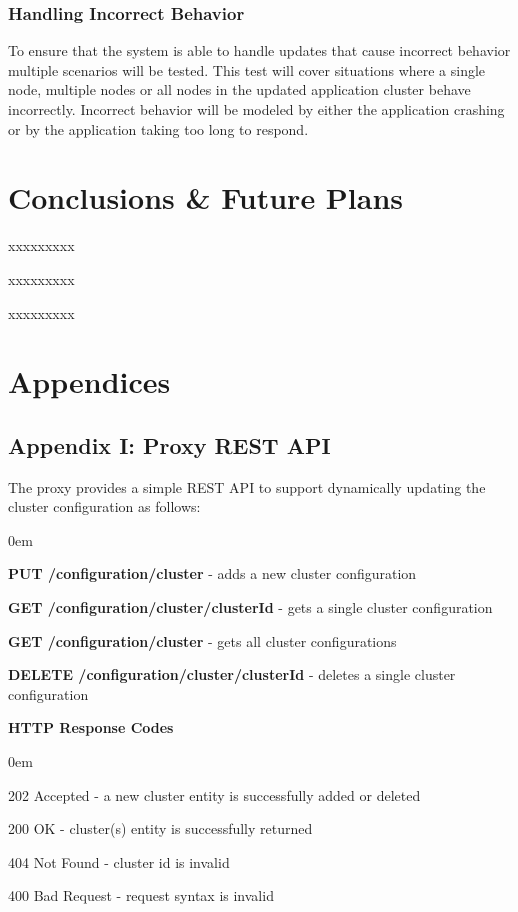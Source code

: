 \documentclass[a4paper,11pt,twoside]{report}
\begin{document}
  
   

   




\subsection{Handling Incorrect Behavior} 
To ensure that the system is able to handle updates that cause incorrect behavior multiple scenarios will be tested. This test will cover situations where a single node, multiple nodes or all nodes in the updated application cluster behave incorrectly. Incorrect behavior will be modeled by either the application crashing or by the application taking too long to respond.
\clearpage



\chapter{Conclusions \& Future Plans}
xxxxxxxxx\bigskip

xxxxxxxxx\bigskip

xxxxxxxxx\bigskip


\clearpage

\chapter{Appendices}

\section*{Appendix I: Proxy REST API}\label{Appendix I}
The proxy provides a simple REST API to support dynamically updating the cluster configuration as follows:

\begin{list}{-}{}
  \itemsep0em
  \item \textbf{PUT /configuration/cluster} - adds a new cluster configuration  
 \item\textbf{GET /configuration/cluster/{clusterId}} - gets a single cluster configuration
 \item\textbf{GET /configuration/cluster} - gets all cluster configurations
 \item\textbf{DELETE /configuration/cluster/{clusterId}} - deletes a single cluster configuration
\end{list}

\noindent
\textbf{HTTP Response Codes}
\begin{list}{-}{}
  \itemsep0em
\item 202 Accepted - a new cluster entity is successfully added or deleted 
\item 200 OK - cluster(s) entity is successfully returned   
\item 404 Not Found - cluster id is invalid
\item 400 Bad Request - request syntax is  invalid
\end{list}
\end{document}
